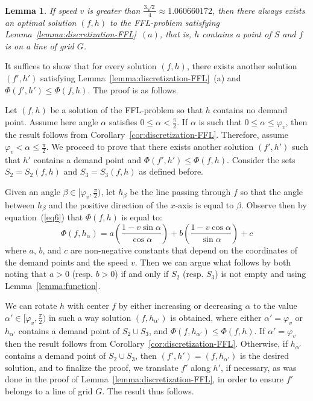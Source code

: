 \documentclass[11pt,a4paper,oneside,onecolumn]{article}
\newtheorem{lemma}[theorem]{Lemma}
\def\QED{\ensuremath{{\square}}}
\def\markatright#1{\leavevmode\unskip\nobreak\quad\hspace*{\fill}{#1}}
\newenvironment{proof}
{\begin{trivlist}\item[\hskip\labelsep{\bf Proof.}]}
{\markatright{\QED}\end{trivlist}}
\begin{document}
\begin{lemma}\label{lemma:discretization-FFL-2}
If speed $v$ is greater than $\frac{3\sqrt{2}}{4}\approx
1.060660172$, then there always exists an optimal solution $(f,h)$
to the FFL-problem satisfying
Lemma~\ref{lemma:discretization-FFL}~$(a)$, that is, $h$ contains a
point of $S$ and $f$ is on a line of grid $G$.
\end{lemma}
\begin{proof}
It suffices to show that for every solution $(f,h)$, there
exists another solution $(f',h')$ satisfying
Lemma~\ref{lemma:discretization-FFL}~(a) and
$\Phi(f',h')\leq\Phi(f,h)$. The proof is as follows.

Let $(f,h)$ be a solution of the FFL-problem so that $h$
contains no demand point. Assume here angle $\alpha$ satisfies
$0\leq\alpha<\frac{\pi}{2}$. If $\alpha$ is such that
$0\leq\alpha\leq\varphi_v$, then the result follows from
Corollary~\ref{cor:discretization-FFL}. Therefore, assume
$\varphi_v<\alpha\leq\frac{\pi}{2}$.
We proceed to prove that there exists another solution
$(f',h')$ such that $h'$ contains a demand point and
$\Phi(f',h')\leq\Phi(f,h)$. Consider the sets $S_2=S_2(f,h)$ and
$S_3=S_3(f,h)$ as defined before.

Given an angle $\beta\in[\varphi_v,\frac{\pi}{2})$, let $h_{\beta}$
be the line passing through $f$ so that the angle between
$h_{\beta}$ and the positive direction of the $x$-axis is equal to
$\beta$. Observe then by equation~(\ref{eq6}) that $\Phi(f,h)$ is equal to:
$$\Phi(f,h_{\alpha})=a\left(\frac{1-v\sin\alpha}{\cos\alpha}\right)+b\left(\frac{
1-v\cos\alpha}{\sin\alpha}\right)+c$$
where $a$, $b$, and $c$ are non-negative constants that depend on
the coordinates of the demand points and the speed $v$. Then we can
argue what follows by both noting that $a>0$ (resp. $b>0$) if and only if
$S_2$ (resp. $S_3$) is not empty and using
Lemma~\ref{lemma:function}.

We can rotate $h$ with center $f$ by either increasing or decreasing
$\alpha$ to the value $\alpha'\in[\varphi_v,\frac{\pi}{2})$ in such
a way solution $(f,h_{\alpha'})$ is obtained, where either
$\alpha'=\varphi_v$ or $h_{\alpha'}$ contains a demand point of
$S_2\cup S_3$, and $\Phi(f,h_{\alpha'})\leq\Phi(f,h)$. If
$\alpha'=\varphi_v$ then the result follows from
Corollary~\ref{cor:discretization-FFL}. Otherwise, if $h_{\alpha'}$
contains a demand point of $S_2\cup S_3$, then
$(f',h')=(f,h_{\alpha'})$ is the desired solution, and to
finalize the proof, we translate $f'$ along $h'$, if necessary, as
was done in the proof of Lemma~\ref{lemma:discretization-FFL}, in
order to ensure $f'$ belongs to a line of grid $G$. The result thus
follows.
\end{proof}
\end{document}
